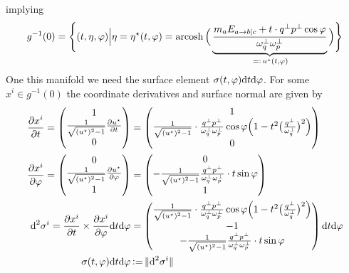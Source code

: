 implying 
\begin{equation}
    g^{-1}(0)=\Bigg\{(t,\eta,\varphi)\Big\vert\eta=\eta^\star(t,\varphi)={\text{arcosh}\,}\Big(\underbrace{\frac{m_a E_{a\rightarrow b\vert c}+t\cdot q^\perp p^\perp\cos\varphi}{\omega_q^\perp\omega_p^\perp}}_{{\,=\vcentcolon\,} u^\star(t,\varphi)}\Big)\Bigg\}
\end{equation}
One this manifold we need the surface element $\sigma(t,\varphi)\text{d} t\text{d}\varphi$. For some $x^i\in g^{-1}(0)$ the coordinate derivatives and surface normal are given by
\begin{subequations}
    \begin{align}        
        \frac{\partial x^i}{\partial t}=\begin{pmatrix}
            1\\
            \frac{1}{\sqrt{(u^\star)^2-1}}\frac{\partial u^\star}{\partial t}\\
            0
        \end{pmatrix}&=\begin{pmatrix}
            1\\
        \frac{1}{\sqrt{(u^\star)^2-1}}\cdot\frac{q^\perp p^\perp}{\omega_q^\perp\omega_p^\perp}\cos\varphi\Big(1-t^2\big(\frac{q^\perp}{\omega_q^\perp}\big)^2\Big)\\
        0
    \end{pmatrix}\\
    \frac{\partial x^i}{\partial \varphi}=\begin{pmatrix}
        0\\
        \frac{1}{\sqrt{(u^\star)^2-1}}\frac{\partial u^\star}{\partial\varphi}\\
        1
    \end{pmatrix}&=\begin{pmatrix}
        0\\
        -\frac{1}{\sqrt{(u^\star)^2-1}}\frac{q^\perp p^\perp}{\omega_q^\perp\omega_p^\perp}\cdot t\sin\varphi\\
        1
    \end{pmatrix}\\
    \text{d}^2\sigma^i=\frac{\partial x^i}{\partial t}\times\frac{\partial x^i}{\partial\varphi}\text{d} t\text{d}\varphi&=\begin{pmatrix}
        \frac{1}{\sqrt{(u^\star)^2-1}}\cdot\frac{q^\perp p^\perp}{\omega_q^\perp\omega_p^\perp}\cos\varphi\Big(1-t^2\big(\frac{q^\perp}{\omega_q^\perp}\big)^2\Big)\\
        -1\\
        -\frac{1}{\sqrt{(u^\star)^2-1}}\frac{q^\perp p^\perp}{\omega_q^\perp\omega_p^\perp}\cdot t\sin\varphi
    \end{pmatrix}\text{d} t\text{d}\varphi\\
    \sigma(t,\varphi)\text{d} t\text{d}\varphi&{\,\vcentcolon=\,} \Vert\text{d}^2\sigma^i\Vert
\end{align}
\end{subequations}

